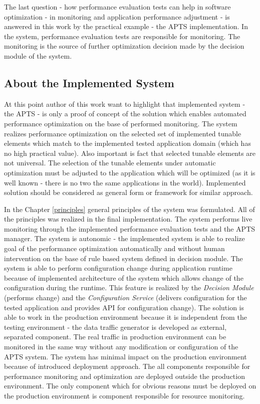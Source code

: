 \documentclass[12pt,a4paper]{article}
\begin{document}
The last question - how performance evaluation tests can help in software optimization - in monitoring and application performance adjustment - is answered in this work by the practical example - the APTS implementation. In the system, performance evaluation tests are responsible for monitoring. The monitoring is the source of further optimization decision made by the decision module of the system.  


\subsection{About the Implemented System}

At this point author of this work want to highlight that implemented system - the APTS - is only a proof of concept of the solution which enables automated performance optimization on the base of performed monitoring. The system realizes performance optimization on the selected set of implemented tunable elements which match to the implemented tested application domain (which has no high practical value). Also important is fact that selected tunable elements are not universal. The selection of the tunable elements under automatic optimization must be adjusted to the application which will be optimized (as it is well known - there is no two the same applications in the world). Implemented solution should be considered as general form or framework for similar approach. 

In the Chapter \ref{principles} general principles of the system was formulated. All of the principles was realized in the final implementation. The system performs live monitoring through the implemented performance evaluation tests and the APTS manager. The system is autonomic - the implemented system is able to realize goal of the performance optimization automatically and without human intervention on the base of rule based system defined in decision module. The system is able to perform configuration change during application runtime because of implemented architecture of the system which allows change of the configuration during the runtime. This feature is realized by the \textit{Decision Module} (performs change) and the \textit{Configuration Service} (delivers configuration for the tested application and provides API for configuration change). The solution is able to work in the production environment because it is independent from the testing environment - the data traffic generator is developed as external, separated  component. The real traffic in production environment can be monitored in the same way without any modification or configuration of the APTS system. The system has minimal impact on the production environment because of introduced deployment approach. The all components responsible for performance monitoring and optimization are deployed outside the production environment. The only component which for obvious reasons must be deployed on the production environment is component responsible for resource monitoring.  
\end{document}

